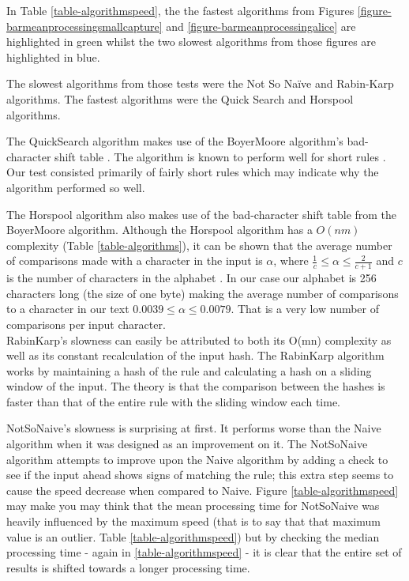\documentclass[9pt, technote]{IEEEtran}
\begin{document}
In Table \ref{table-algorithmspeed}, the the fastest algorithms from Figures \ref{figure-barmeanprocessingsmallcapture} and \ref{figure-barmeanprocessingalice} are highlighted in green whilst the two slowest algorithms from those figures are highlighted in blue.

The slowest algorithms from those tests were the Not So Na\"ive \citep{hancart1993} and Rabin-Karp \cite{karp1987} algorithms. The fastest algorithms were the Quick Search \citep{sunday1990} and Horspool \citep{horspool1980} algorithms.

The QuickSearch \citep{sunday1990} algorithm makes use of the BoyerMoore \citep{boyer1977} algorithm's bad-character shift table \citep{charras2004}. The algorithm is known to perform well for short rules \citep{leqroc1995}. Our test consisted primarily of fairly short rules which may indicate why the algorithm performed so well.

The Horspool \citep{horspool1980} algorithm also makes use of the bad-character shift table from the BoyerMoore \citep{boyer1977} algorithm. Although the Horspool algorithm has a $O(nm)$ complexity (Table \ref{table-algorithms}), it can be shown that the average number of comparisons made with a character in the input is $\alpha$, where $\frac{1}{c} \leq \alpha \leq \frac{2}{c+1}$ and $c$ is the number of characters in the alphabet \citep{baezayates1992b}. In our case our alphabet is 256 characters long (the size of one byte) making the average number of comparisons to a character in our text $0.0039 \leq \alpha \leq 0.0079$. That is a very low number of comparisons per input character.\\

RabinKarp's \citep{karp1987} slowness can easily be attributed to both its O(mn) complexity as well as its constant recalculation of the input hash. The RabinKarp algorithm works by maintaining a hash of the rule and calculating a hash on a sliding window of the input. The theory is that the comparison between the hashes is faster than that of the entire rule with the sliding window each time.

NotSoNaive's \citep{hancart1993} slowness is surprising at first. It performs worse than the Naive algorithm when it was designed as an improvement on it. The NotSoNaive algorithm attempts to improve upon the Naive algorithm by adding a check to see if the input ahead shows signs of matching the rule; this extra step seems to cause the speed decrease when compared to Naive. Figure \ref{table-algorithmspeed} may make you may think that the mean processing time for NotSoNaive was heavily influenced by the maximum speed (that is to say that that maximum value is an outlier. Table \ref{table-algorithmspeed}) but by checking the median processing time - again in \ref{table-algorithmspeed} - it is clear that the entire set of results is shifted towards a longer processing time.
\end{document}
